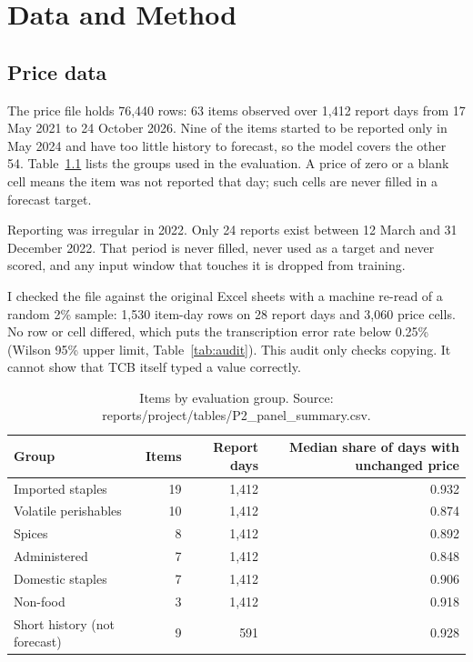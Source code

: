 \documentclass[12pt]{report}
\begin{document}
\chapter{Data and Method}

\section{Price data}
The price file holds 76,440 rows: 63 items observed over 1,412 report days from 17 May 2021 to 24 October 2026. Nine of the items started to be reported only in May 2024 and have too little history to forecast, so the model covers the other 54. Table~\ref{tab:strata} lists the groups used in the evaluation. A price of zero or a blank cell means the item was not reported that day; such cells are never filled in a forecast target.

Reporting was irregular in 2022. Only 24 reports exist between 12 March and 31 December 2022. That period is never filled, never used as a target and never scored, and any input window that touches it is dropped from training.

I checked the file against the original Excel sheets with a machine re-read of a random 2\% sample: 1,530 item-day rows on 28 report days and 3,060 price cells. No row or cell differed, which puts the transcription error rate below 0.25\% (Wilson 95\% upper limit, Table~\ref{tab:audit}). This audit only checks copying. It cannot show that TCB itself typed a value correctly.

\begin{table}[H]\centering\small
\caption{Items by evaluation group. Source: reports/project/tables/P2\_panel\_summary.csv.}\label{tab:strata}
\begin{tabular}{lrrr}
\toprule
Group & Items & Report days & Median share of days with unchanged price \\
\midrule
Imported staples & 19 & 1,412 & 0.932 \\
Volatile perishables & 10 & 1,412 & 0.874 \\
Spices & 8 & 1,412 & 0.892 \\
Administered & 7 & 1,412 & 0.848 \\
Domestic staples & 7 & 1,412 & 0.906 \\
Non-food & 3 & 1,412 & 0.918 \\
Short history (not forecast) & 9 & 591 & 0.928 \\
\bottomrule
\end{tabular}
\end{table}
\end{document}
